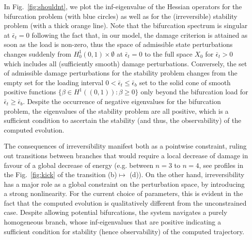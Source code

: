 
In Fig.~\ref{fig:shouldnt}, we plot the inf-eigenvalue of the Hessian operators for the bifurcation problem (with blue circles) as well as for the (irreversible) stability problem (with a thick orange line). 
Note that the bifurcation spectrum is singular at $\bar \epsilon_t=0$ following the fact that, in our model, the damage criterion is attained as soon as the load is non-zero, thus the space of admissible state perturbations changes suddenly from $H^1_0(0,1) \times \emptyset$ at $\bar \epsilon_t=0$ to the full space $X_0$ for $\bar \epsilon_t>0$ which includes all (sufficiently smooth) damage perturbations. 
Conversely, the set of admissible damage perturbations for the stability problem changes from the empty set for the loading interval $0 < \bar\epsilon_t\leq \bar\epsilon_b$ set to the solid cone of smooth positive functions $\{\beta\in H^1((0,1)):\beta \geq 0\}$ only beyond the bifurcation load for $\bar\epsilon_t \geq \bar\epsilon_b$.
Despite the occurrence of negative eigenvalues for the bifurcation problem, the eigenvalues of the stability problem are all positive, which is a sufficient condition to ascertain the stability (and thus, the observability) of the computed evolution.

The consequences of irreversibility manifest both as a pointwise constraint, ruling out transitions between branches that would require a local decrease of damage in favour of a global decrease of energy (e.g. between $n=3$ to $n=4$, see profiles in the Fig.~\ref{fig:kick} of the transition (b)$\mapsto$ (d)). 
On the other hand, irreversibility has a major role  as a global constraint on the perturbation space, by introducing a strong nonlinearity. For the current choice of parameters, this is evident in the fact that the computed evolution is qualitatively different from the unconstrained case. Despite allowing potential bifurcations, the system navigates a purely homogeneous branch, whose inf-eigenvalues that are positive indicating a sufficient condition for stability (hence observability) of the computed trajectory.

